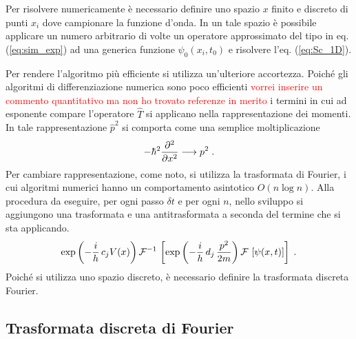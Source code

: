 Per risolvere numericamente è necessario definire uno spazio $x$ finito e discreto di punti ${x_i}$ dove campionare la funzione d'onda. In un tale spazio è possibile applicare un numero arbitrario di volte un operatore approssimato del tipo in eq. (\ref{eq:sim_exp}) ad una generica funzione $\psi_{0}(x_i,t_{0})$ e risolvere l'eq. (\ref{eq:Sc_1D}).

Per rendere l'algoritmo più efficiente si utilizza un'ulteriore accortezza. 
Poiché gli algoritmi di differenziazione numerica sono poco efficienti \textcolor{red} {vorrei inserire un commento quantitativo ma non ho trovato referenze in merito} %
i termini %
in cui ad esponente compare l'operatore $\hat{T}$ si applicano nella rappresentazione dei momenti. In tale rappresentazione $\hat{p}^2$ si comporta come una semplice moltiplicazione 
\begin{equation}
    \centering
    - \hbar^2 \frac{\partial^{2}}{\partial x^{2}} \longrightarrow p^{2} \; \text{.}
    \label{eq:p^2}
\end{equation}
Per cambiare rappresentazione, come noto, si utilizza la trasformata di Fourier, i cui algoritmi numerici hanno un comportamento asintotico $O(n \log n)$. Alla procedura da eseguire, per ogni passo $\delta t$ e per ogni $n$, nello sviluppo si aggiungono una trasformata e una antitrasformata a seconda del termine che si sta applicando.
\begin{equation}
    \centering
     \exp \left(- \frac{i}{h} \, c_{j} V(x)\right) \mathcal{F}^{-1} \, \left[  \exp \left(- \frac{i}{h} \, d_{j} \, \frac{p^2}{2m} \right) \mathcal{F} \, \left[  \psi(x, t) \right] \right] \; \text{.}
    \label{eq:trasf_anti}
\end{equation}
Poiché si utilizza uno spazio discreto, è necessario definire la trasformata discreta Fourier.

\subsection{Trasformata discreta di Fourier}
\label{sec:DFT}


